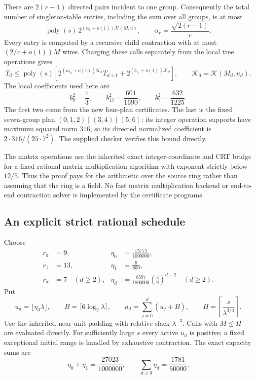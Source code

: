 There are $2(r-1)$ directed pairs incident to one group. Consequently the
total number of singleton-table entries, including the sum over all groups,
is at most
\[
 \operatorname{poly}(s)\,
 2^{(\alpha_r+o(1))\mathcal K(M,u)},\qquad
 \alpha_r=\frac{\sqrt{2(r-1)}}r.
\]
Every entry is computed by a recursive child contraction with at most
$(2/r+o(1))M$ wires. Charging these calls separately from the local tree
operations gives
\begin{equation}
 T_d\le \operatorname{poly}(s)
 \left[2^{(\alpha_{r_d}+o(1))\mathcal K_d}T_{d+1}
       +2^{(b_{r_d}+o(1))\mathcal K_d}\right],
 \qquad \mathcal K_d=\mathcal K(M_d,u_d).
 \label{eq:affine-paid-recurrence}
\end{equation}
The local coefficients used here are
\[
 b_9^2=\frac13,\qquad b_{13}^2=\frac{601}{1690},\qquad
 b_7^2=\frac{632}{1225}.
\]
The first two come from the new four-plan certificates. The last is the
fixed seven-group plan $(0,1,2)\mid(3,4)\mid(5,6)$: its integer operation
supports have maximum squared norm $316$, so its directed normalized
coefficient is $2\cdot316/(25\cdot7^2)$. The supplied checker verifies this
bound directly.

The matrix operations use the inherited exact integer-coordinate and CRT
bridge for a fixed rational matrix multiplication algorithm with exponent
strictly below $12/5$. Thus the proof pays for the arithmetic over the
source ring rather than assuming that the ring is a field. No fast matrix
multiplication backend or end-to-end contraction solver is implemented by
the certificate programs.

\subsection{An explicit strict rational schedule}

Choose
\begin{align*}
 r_0&=9,& \eta_0&=\frac{15773}{1000000},\\
 r_1&=13,&\eta_1&=\frac9{800},\\
 r_d&=7\quad(d\ge2),&
 \eta_d&=\frac{8597}{1800000}
                   \left(\frac49\right)^{d-2}\quad(d\ge2).
\end{align*}
Put
\[
 u_d=\lfloor\eta_d\lambda\rfloor,\qquad
 B=\lceil6\log_2\lambda\rceil,\qquad
 a_d=\sum_{j=0}^d(u_j+B),\qquad
 H=\left\lceil\frac{s}{\lambda^{3/4}}\right\rceil.
\]
Use the inherited near-unit padding with relative slack $\lambda^{-3}$.
Calls with $M\le H$ are evaluated directly. For sufficiently large $s$
every active $u_d$ is positive; a fixed exceptional initial range is handled
by exhaustive contraction. The exact capacity sums are
\[
 \eta_0+\eta_1=\frac{27023}{1000000},\qquad
 \sum_{d\ge0}\eta_d=\frac{1781}{50000}.
\]


